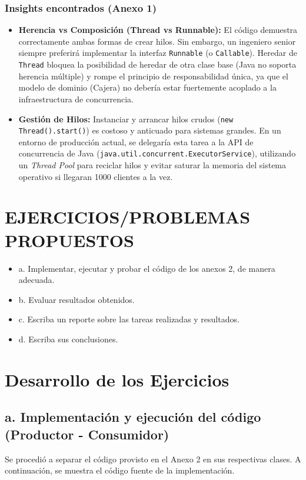 \documentclass{article}
\begin{document}
    \subsubsection*{Insights encontrados (Anexo 1)}
    \begin{itemize}
        \item \textbf{Herencia vs Composición (Thread vs Runnable):} El código demuestra correctamente ambas formas de crear hilos. Sin embargo, un ingeniero senior siempre preferirá implementar la interfaz \texttt{Runnable} (o \texttt{Callable}). Heredar de \texttt{Thread} bloquea la posibilidad de heredar de otra clase base (Java no soporta herencia múltiple) y rompe el principio de responsabilidad única, ya que el modelo de dominio (Cajera) no debería estar fuertemente acoplado a la infraestructura de concurrencia.
        \item \textbf{Gestión de Hilos:} Instanciar y arrancar hilos crudos (\texttt{new Thread().start()}) es costoso y anticuado para sistemas grandes. En un entorno de producción actual, se delegaría esta tarea a la API de concurrencia de Java (\texttt{java.util.concurrent.ExecutorService}), utilizando un \textit{Thread Pool} para reciclar hilos y evitar saturar la memoria del sistema operativo si llegaran 1000 clientes a la vez.
    \end{itemize}

\section{EJERCICIOS/PROBLEMAS PROPUESTOS}
	\begin{itemize}		
		\item a. Implementar, ejecutar y probar el código de los anexos 2, de manera adecuada.
		\item b. Evaluar resultados obtenidos.
    \item c. Escriba un reporte sobre las tareas realizadas y resultados.
    \item d. Escriba sus conclusiones.
	\end{itemize}
    
	\section{Desarrollo de los Ejercicios}
    
    \subsection{a. Implementación y ejecución del código (Productor - Consumidor)}
    Se procedió a separar el código provisto en el Anexo 2 en sus respectivas clases. A continuación, se muestra el código fuente de la implementación.
\end{document}
